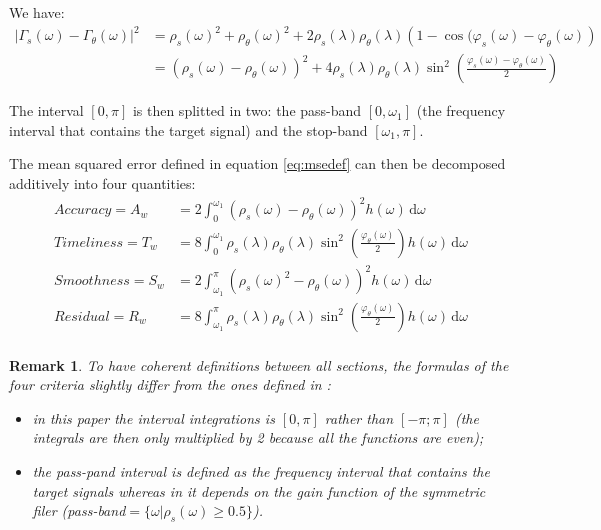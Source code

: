 \documentclass[
  12pt,
  ,
  a4paper]{article}
\newcommand\1{\mathds{1}}
\newcommand\ud{\,\mathrm{d}}
\newtheorem*{remark}{Remark}
\begin{document}
We have:
\begin{align}
\left|\Gamma_s(\omega)-\Gamma_\theta(\omega)\right|^{2} & =\rho_s(\omega)^{2}+\rho_\theta(\omega)^{2}+2\rho_s(\lambda)\rho_\theta(\lambda)\left(1-\cos(\varphi_s(\omega)-\varphi_\theta(\omega)\right) \nonumber\\
 & =\left(\rho_s(\omega)-\rho_\theta(\omega)\right)^{2}+4\rho_s(\lambda)\rho_\theta(\lambda)\sin^{2}\left(\frac{\varphi_s(\omega)-\varphi_\theta(\omega)}{2}\right)
 \label{eq:msedecomp}
\end{align}

The interval \([0,\pi]\) is then splitted in two: the pass-band \([0,\omega_1]\) (the frequency interval that contains the target signal) and the stop-band \([\omega_1,\pi]\).

The mean squared error defined in equation \eqref{eq:msedef} can then be decomposed additively into four quantities:
\begin{align*}
Accuracy =A_w&= 2\int_0^{\omega_1}\left(\rho_s(\omega)-\rho_\theta(\omega)\right)^{2}h(\omega)\ud\omega\\
Timeliness =T_w&= 8\int_0^{\omega_1}\rho_s(\lambda)\rho_\theta(\lambda)\sin^{2}\left(\frac{\varphi_\theta(\omega)}{2}\right)h(\omega)\ud\omega\\
Smoothness =S_w&= 2\int_{\omega_1}^\pi\left(\rho_s(\omega)^{2}-\rho_\theta(\omega)\right)^{2}h(\omega)\ud\omega\\
Residual =R_w&= 8\int_{\omega_1}^\pi\rho_s(\lambda)\rho_\theta(\lambda)\sin^{2}\left(\frac{\varphi_\theta(\omega)}{2}\right)h(\omega)\ud\omega\\
\end{align*}

\begin{remark}

To have coherent definitions between all sections, the formulas of the four criteria slightly differ from the ones defined in \textcite{trilemmaWMR2019}:

\begin{itemize}
\item
  in this paper the interval integrations is \([0,\pi]\) rather than \([-\pi;\pi]\) (the integrals are then only multiplied by 2 because all the functions are even);
\item
  the pass-pand interval is defined as the frequency interval that contains the target signals whereas in \textcite{trilemmaWMR2019} it depends on the gain function of the symmetric filer (pass-band\(=\{\omega |\rho_s(\omega)\geq 0.5\}\)).
\end{itemize}

\end{remark}
\end{document}
